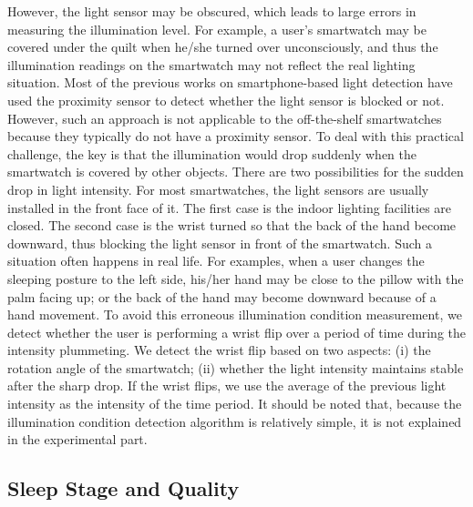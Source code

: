 However, the light sensor may be obscured, which leads to large errors in measuring the illumination level. For example, a user's smartwatch may be covered under the quilt when he/she turned over unconsciously, and thus the illumination readings on the smartwatch may not reflect the real lighting situation. Most of the previous works on smartphone-based light detection have used the proximity sensor to detect whether the light sensor is blocked or not. However, such an approach is not applicable to the off-the-shelf smartwatches because they typically do not have a proximity sensor.  To deal with this practical challenge, the key is that the illumination would drop suddenly when the smartwatch is covered by other objects. There are two possibilities for the sudden drop in light intensity. For most smartwatches, the light sensors are usually installed in the front face of it. The first case is the indoor lighting facilities are closed. The second case is the wrist turned so that the back of the hand become downward, thus blocking the light sensor in front of the smartwatch. Such a situation often happens in real life. For examples, when a user changes the sleeping posture to the left side, his/her hand may be close to the pillow with the palm facing up; or the back of the hand may become downward because of a hand movement. To avoid this erroneous illumination condition measurement, we detect whether the user is performing a wrist flip over a period of time during the intensity plummeting. We detect the wrist flip based on two aspects: (i) the rotation angle of the smartwatch; (ii) whether the light intensity maintains stable after the sharp drop. If the wrist flips, we use the average of the previous light intensity as the intensity of the time period. It should be noted that, because the illumination condition detection algorithm is relatively simple, it is not explained in the experimental part.

\subsection{Sleep Stage and Quality}

